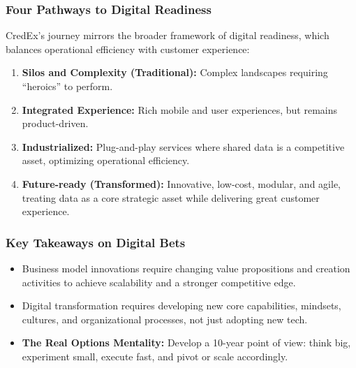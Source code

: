 \subsubsection{Four Pathways to Digital Readiness}
CredEx's journey mirrors the broader framework of digital readiness, which
balances operational efficiency with customer experience:
\begin{enumerate}
    \item \textbf{Silos and Complexity (Traditional):} Complex landscapes requiring ``heroics''
          to perform.
    \item \textbf{Integrated Experience:} Rich mobile and user experiences, but remains
          product-driven.
    \item \textbf{Industrialized:} Plug-and-play services where shared data is a competitive
          asset, optimizing operational efficiency.
    \item \textbf{Future-ready (Transformed):} Innovative, low-cost, modular, and agile, treating
          data as a core strategic asset while delivering great customer experience.
\end{enumerate}

\subsubsection{Key Takeaways on Digital Bets}
\begin{itemize}
    \item Business model innovations require changing value propositions and creation
          activities to achieve scalability and a stronger competitive edge.
    \item Digital transformation requires developing new core capabilities, mindsets,
          cultures, and organizational processes, not just adopting new tech.
    \item \textbf{The Real Options Mentality:} Develop a 10-year point of view: think big,
          experiment small, execute fast, and pivot or scale accordingly.
\end{itemize}